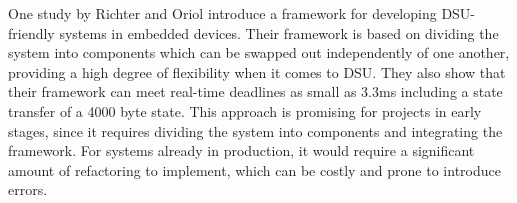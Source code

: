 
One study by Richter and Oriol \cite{richter2009} introduce a framework for developing DSU-friendly systems in embedded devices. Their framework is based on dividing the system into components which can be swapped out independently of one another, providing a high degree of flexibility when it comes to DSU. They also show that their framework can meet real-time deadlines as small as 3.3ms including a state transfer of a  4000 byte state.  This approach is promising for projects in early stages, since it requires dividing the system into components and integrating the framework. For systems already in production, it would require a significant amount of refactoring to implement, which can be costly and prone to introduce errors.
